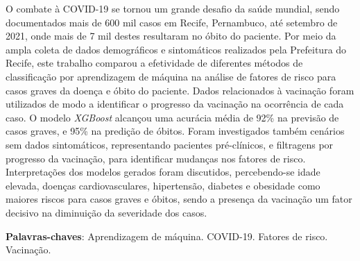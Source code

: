 
\begin{resumo}[Resumo] 

O combate à COVID-19 se tornou um grande desafio da saúde mundial, sendo documentados mais de 600 mil casos em Recife, Pernambuco, até setembro de 2021, onde mais de 7 mil destes resultaram no óbito do paciente. Por meio da ampla coleta de dados demográficos e sintomáticos realizados pela Prefeitura do Recife, este trabalho comparou a efetividade de diferentes métodos de classificação por aprendizagem de máquina na análise de fatores de risco para casos graves da doença e óbito do paciente. Dados relacionados à vacinação foram utilizados de modo a identificar o progresso da vacinação na ocorrência de cada caso. O modelo \textit{XGBoost} alcançou uma acurácia média de 92\% na previsão de casos graves, e 95\% na predição de óbitos. Foram investigados também cenários sem dados sintomáticos, representando pacientes pré-clínicos, e filtragens por progresso da vacinação, para identificar mudanças nos fatores de risco. Interpretações dos modelos gerados foram discutidos, percebendo-se idade elevada, doenças cardiovasculares, hipertensão, diabetes e obesidade como maiores riscos para casos graves e óbitos, sendo a presença da vacinação um fator decisivo na diminuição da severidade dos casos.

 \vspace{\onelineskip}
    
 \noindent
 \textbf{Palavras-chaves}: Aprendizagem de máquina. COVID-19. Fatores de risco. Vacinação.
\end{resumo}



